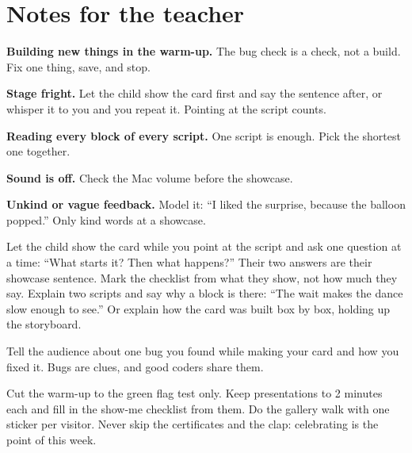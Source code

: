 \section{Notes for the teacher}
\begin{commonmistakes}
  \item \textbf{Building new things in the warm-up.} The bug check is a check, not a build. Fix one thing, save, and stop.
  \item \textbf{Stage fright.} Let the child show the card first and say the sentence after, or whisper it to you and you repeat it. Pointing at the script counts.
  \item \textbf{Reading every block of every script.} One script is enough. Pick the shortest one together.
  \item \textbf{Sound is off.} Check the Mac volume before the showcase.
  \item \textbf{Unkind or vague feedback.} Model it: \enquote{I liked the surprise, because the balloon popped.} Only kind words at a showcase.
\end{commonmistakes}

\begin{differentiation}
\supportpath Let the child show the card while you point at the script and ask one question at a time: \enquote{What starts it? Then what happens?} Their two answers are their showcase sentence. Mark the checklist from what they show, not how much they say.
\extensionpath Explain two scripts and say why a block is there: \enquote{The wait makes the dance slow enough to see.} Or explain how the card was built box by box, holding up the storyboard.
\end{differentiation}

\begin{stretchchallenge}
Tell the audience about one bug you found while making your card and how you fixed it. Bugs are clues, and good coders share them.
\end{stretchchallenge}

\begin{teachernote}
Cut the warm-up to the green flag test only. Keep presentations to 2 minutes each and fill in the show-me checklist from them. Do the gallery walk with one sticker per visitor. Never skip the certificates and the clap: celebrating is the point of this week.
\end{teachernote}
